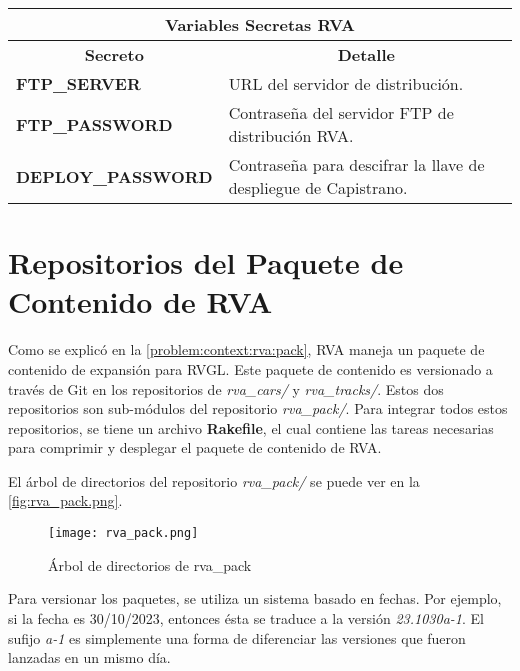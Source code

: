 \begin{center}
  \begin{tabular}{ | p{5cm} | p{10cm}| }
    \hline
    \multicolumn{2}{|c|}{\textbf{Variables Secretas RVA}} \\
    \hline
    \multicolumn{1}{|c|}{\textbf{Secreto}} & \multicolumn{1}{|c|}{\textbf{Detalle}} \\
    \hline
    {\textbf{FTP\_SERVER}} & URL del servidor de distribución. \\ \hline
    
    {\textbf{FTP\_PASSWORD}} & Contraseña del servidor FTP de distribución RVA. \\ \hline
    
    {\textbf{DEPLOY\_PASSWORD}} & Contraseña para descifrar la llave de despliegue de Capistrano. \\
    
    \hline
  \end{tabular}
  \label{table:rva:secrets}
\end{center}

\newpage

\section{Repositorios del Paquete de Contenido de RVA}
Como se explicó en la \autoref{problem:context:rva:pack}, RVA maneja un paquete de contenido de expansión para RVGL. Este paquete de contenido es versionado a través de Git en los repositorios de \textit{rva\_cars/} y \textit{rva\_tracks/}. Estos dos repositorios son sub-módulos del repositorio \textit{rva\_pack/}. Para integrar todos estos repositorios, se tiene un archivo \textbf{Rakefile}, el cual contiene las tareas necesarias para comprimir y desplegar el paquete de contenido de RVA.

El árbol de directorios del repositorio \textit{rva\_pack/} se puede ver en la \autoref{fig:rva_pack.png}.

\begin{figure}[H]
  \begin{center}
    \texttt{[image: rva\_pack.png]}
  \end{center}
  \caption[Árbol de directorios de rva\_pack]{Árbol de directorios de rva\_pack}
  \label{fig:rva_pack.png}
\end{figure}

Para versionar los paquetes, se utiliza un sistema basado en fechas. Por ejemplo, si la fecha es 30/10/2023, entonces ésta se traduce a la versión \textit{23.1030a-1}. El sufijo \textit{a-1} es simplemente una forma de diferenciar las versiones que fueron lanzadas en un mismo día.

